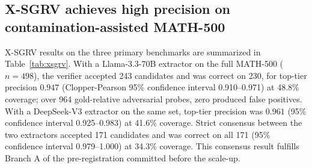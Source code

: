\documentclass[11pt]{article}
\begin{document}
\subsection{X-SGRV achieves high precision on contamination-assisted MATH-500}

X-SGRV results on the three primary benchmarks are summarized in Table~\ref{tab:xsgrv}. With a Llama-3.3-70B extractor on the full MATH-500 ($n{=}498$), the verifier accepted 243 candidates and was correct on 230, for top-tier precision $0.947$ (Clopper-Pearson 95\% confidence interval 0.910--0.971) at 48.8\% coverage; over 964 gold-relative adversarial probes, zero produced false positives. With a DeepSeek-V3 extractor on the same set, top-tier precision was $0.961$ (95\% confidence interval 0.925--0.983) at 41.6\% coverage. Strict consensus between the two extractors accepted 171 candidates and was correct on all 171 (95\% confidence interval 0.979--1.000) at 34.3\% coverage. This consensus result fulfills Branch A of the pre-registration committed before the scale-up.
\end{document}
